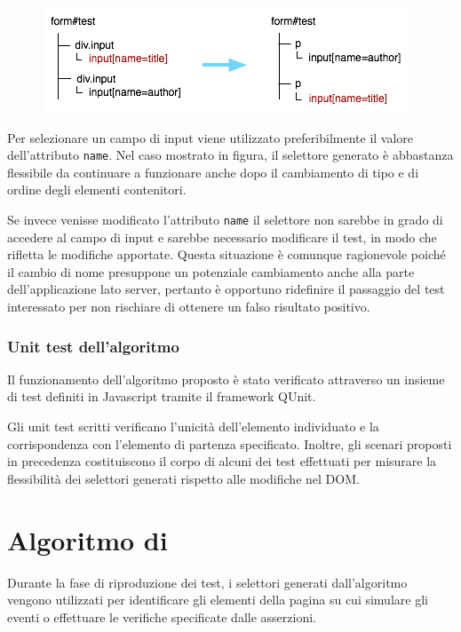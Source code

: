 \documentclass[12pt]{toptesi}
\begin{document}
\begin{figure}[htbp]
\begin{center}
\includegraphics{images/dom_examples/form1.png}
\end{center}
\end{figure}

Per selezionare un campo di input viene utilizzato preferibilmente il valore dell'attributo \verb|name|. Nel caso mostrato in figura, il selettore generato è abbastanza flessibile da continuare a funzionare anche dopo il cambiamento di tipo e di ordine degli elementi contenitori.

Se invece venisse modificato l'attributo \verb|name| il selettore non sarebbe in grado di accedere al campo di input e sarebbe necessario modificare il test, in modo che rifletta le modifiche apportate. Questa situazione è comunque ragionevole poiché il cambio di nome presuppone un potenziale cambiamento anche alla parte dell'applicazione lato server, pertanto è opportuno ridefinire il passaggio del test interessato per non rischiare di ottenere un falso risultato positivo.

\subsection {Unit test dell'algoritmo}

Il funzionamento dell'algoritmo proposto è stato verificato attraverso un insieme di test definiti in Javascript tramite il framework QUnit. 

Gli unit test scritti verificano l'unicità dell'elemento individuato e la corrispondenza con l'elemento di partenza specificato. Inoltre, gli scenari proposti in precedenza costituiscono il corpo di alcuni dei test effettuati per misurare la flessibilità dei selettori generati rispetto alle modifiche nel DOM.

\chapter{Algoritmo di }

Durante la fase di riproduzione dei test, i selettori generati dall'algoritmo vengono utilizzati per identificare gli elementi della pagina su cui simulare gli eventi o effettuare le verifiche specificate dalle asserzioni.
\end{document}
